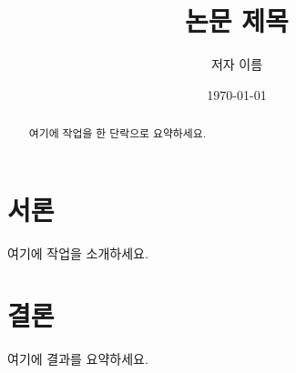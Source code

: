 \documentclass[12pt]{report}
\title{논문 제목}
\author{저자 이름}
\date{\today}
\begin{document}
\maketitle

\begin{abstract}
여기에 작업을 한 단락으로 요약하세요.
\end{abstract}

\tableofcontents

\chapter{서론}
여기에 작업을 소개하세요.

\chapter{결론}
여기에 결과를 요약하세요.
\end{document}
